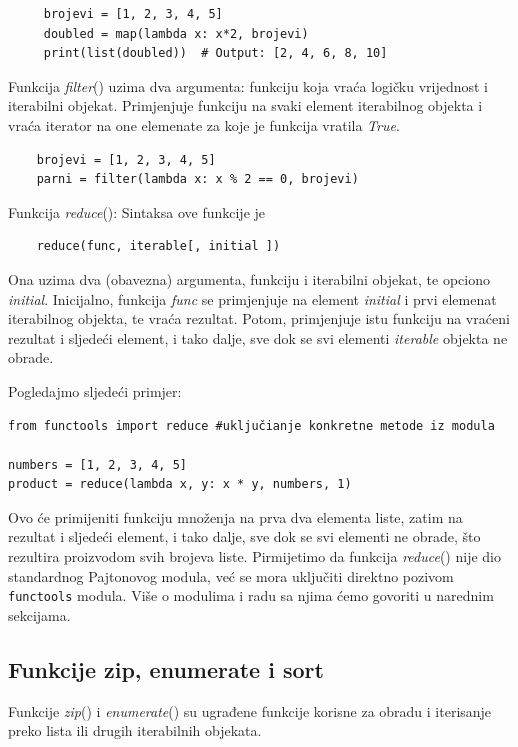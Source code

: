 \begin{verbatim}
     brojevi = [1, 2, 3, 4, 5]
     doubled = map(lambda x: x*2, brojevi)
     print(list(doubled))  # Output: [2, 4, 6, 8, 10]
\end{verbatim}


Funkcija \textit{filter}() uzima dva argumenta: funkciju koja vraća logičku vrijednost i iterabilni objekat. Primjenjuje funkciju na svaki element iterabilnog objekta i vraća iterator na one elemenate za koje je funkcija vratila \emph{True}. 
\begin{verbatim}
	brojevi = [1, 2, 3, 4, 5]
	parni = filter(lambda x: x % 2 == 0, brojevi)
\end{verbatim}

Funkcija  \textit{reduce}(): Sintaksa ove funkcije je

\begin{verbatim}
	reduce(func, iterable[, initial ])
\end{verbatim}

Ona uzima dva (obavezna) argumenta,  funkciju i iterabilni objekat, te opciono \textit{initial}. Inicijalno, funkcija \textit{func} se primjenjuje na element \emph{initial} i prvi elemenat iterabilnog objekta, te vraća rezultat. Potom,    primjenjuje istu funkciju na vraćeni rezultat i sljedeći element, i tako dalje, sve dok se svi elementi \emph{iterable} objekta ne obrade. 

Pogledajmo sljedeći primjer: 
\begin{verbatim}
from functools import reduce #uključianje konkretne metode iz modula 

numbers = [1, 2, 3, 4, 5]
product = reduce(lambda x, y: x * y, numbers, 1)
\end{verbatim}

Ovo će primijeniti funkciju množenja na prva dva elementa liste, zatim na rezultat i sljedeći element, i tako dalje, sve dok se svi elementi ne obrade, što rezultira proizvodom svih brojeva liste. Pirmijetimo da funkcija \textit{reduce}() nije dio standardnog Pajtonovog modula, već se mora uključiti direktno pozivom \texttt{functools} modula. Više o modulima i radu sa njima ćemo govoriti u narednim sekcijama.



\subsection{Funkcije zip, enumerate i sort}
Funkcije  \textit{zip}() i \textit{enumerate}() su ugrađene funkcije korisne za obradu i iterisanje preko lista ili drugih iterabilnih objekata.

